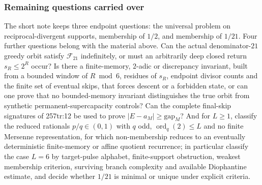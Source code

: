 \subsubsection*{Remaining questions carried over}

The short note keeps three endpoint questions: the universal problem on
reciprocal-divergent supports, membership of $1/2$, and membership of
$1/21$.  Four further questions belong with the material above.  Can the
actual denominator-$21$ greedy orbit satisfy $\mathcal F_{21}$ indefinitely,
or must an arbitrarily deep closed return $s_R\le2^R$ occur?  Is there a
finite-memory, $2$-adic or discrepancy invariant, built from a bounded window
of $R\bmod6$, residues of $s_R$, endpoint divisor counts and the finite set
of eventual skips, that forces descent or a forbidden state, or can one prove
that no bounded-memory invariant distinguishes the true orbit from synthetic
permanent-supercapacity controls?  Can the complete final-skip signatures of
257tr:12 be used to prove $|E-a_M|\ge\mathrm{gap}_M$?  And for $L\ge1$,
classify the reduced rationals $p/q\in(0,1)$ with $q$ odd,
$\operatorname{ord}_q(2)\le L$ and no finite Mersenne representation, for
which non-membership reduces to an eventually deterministic finite-memory or
affine quotient recurrence; in particular classify the case $L=6$ by
target-pulse alphabet, finite-support obstruction, weakest membership
criterion, surviving branch complexity and available Diophantine estimate,
and decide whether $1/21$ is minimal or unique under explicit criteria.
